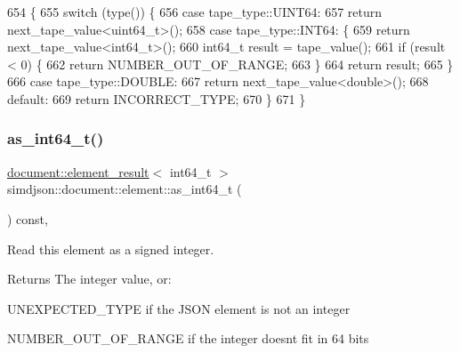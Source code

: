\begin{DoxyCode}
654                                                                                 \{
655   \textcolor{keywordflow}{switch} (type()) \{
656     \textcolor{keywordflow}{case} tape\_type::UINT64:
657       \textcolor{keywordflow}{return} next\_tape\_value<uint64\_t>();
658     \textcolor{keywordflow}{case} tape\_type::INT64: \{
659       \textcolor{keywordflow}{return} next\_tape\_value<int64\_t>();
660       int64\_t result = tape\_value();
661       \textcolor{keywordflow}{if} (result < 0) \{
662         \textcolor{keywordflow}{return} NUMBER\_OUT\_OF\_RANGE;
663       \}
664       \textcolor{keywordflow}{return} result;
665     \}
666     \textcolor{keywordflow}{case} tape\_type::DOUBLE:
667       \textcolor{keywordflow}{return} next\_tape\_value<double>();
668     \textcolor{keywordflow}{default}:
669       \textcolor{keywordflow}{return} INCORRECT\_TYPE;
670   \}
671 \}
\end{DoxyCode}
\mbox{\label{classsimdjson_1_1document_1_1element_ad02cc5dbfb8ae3d5309f8456759120e7}} 
\subsubsection{\texorpdfstring{as\+\_\+int64\+\_\+t()}{as\_int64\_t()}}
{\footnotesize\ttfamily \hyperlink{classsimdjson_1_1document_1_1element__result}{document\+::element\+\_\+result}$<$ int64\+\_\+t $>$ simdjson\+::document\+::element\+::as\+\_\+int64\+\_\+t (\begin{DoxyParamCaption}{ }\end{DoxyParamCaption}) const\hspace{0.3cm}{\ttfamily [inline]}, {\ttfamily [noexcept]}}



Read this element as a signed integer. 

\begin{DoxyReturn}{Returns}
The integer value, or\+:
\begin{DoxyItemize}
\item U\+N\+E\+X\+P\+E\+C\+T\+E\+D\+\_\+\+T\+Y\+PE if the J\+S\+ON element is not an integer
\item N\+U\+M\+B\+E\+R\+\_\+\+O\+U\+T\+\_\+\+O\+F\+\_\+\+R\+A\+N\+GE if the integer doesn\textquotesingle{}t fit in 64 bits 
\end{DoxyItemize}
\end{DoxyReturn}


